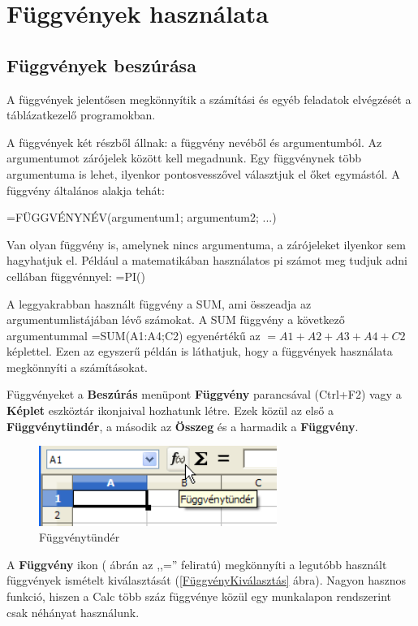 \chapter{Függvények használata}
\thispagestyle{empty}

\section{Függvények beszúrása}

A függvények jelentősen megkönnyítik a számítási és
egyéb feladatok elvégzését a táblázatkezelő
programokban.

A függvények két részből állnak: a függvény
nevéből és argumentumból. Az argumentumot zárójelek
között kell megadnunk. Egy függvénynek több argumentuma is
lehet, ilyenkor pontosvesszővel választjuk el őket
egymástól. A függvény általános alakja tehát:
\begin{center}
=FÜGGVÉNYNÉV(argumentum1; argumentum2; ...)
\end{center}

Van olyan függvény is, amelynek nincs argumentuma, a zárójeleket
ilyenkor sem hagyhatjuk el. Például a matematikában használatos
pi számot meg tudjuk adni cellában függvénnyel: =PI()

A leggyakrabban használt függvény a SUM, ami összeadja az
argumentumlistájában lévő számokat. A SUM függvény a
következő argumentummal =SUM(A1:A4;C2) egyenértékű az
$=A1+A2+A3+A4+C2$ képlettel. Ezen az egyszerű példán is
láthatjuk, hogy a függvények használata megkönnyíti a
számításokat.

Függvényeket a \textbf{Beszúrás} menüpont
\textbf{Függvény} parancsával (Ctrl+F2) vagy a \textbf{Képlet}
eszköztár ikonjaival hozhatunk létre. Ezek közül az első
a \textbf{Függvénytündér}, a második az \textbf{Összeg}
és a harmadik a \textbf{Függvény}.

\begin{figure}[!h]
\begin{center}
\includegraphics[width=7.751cm]{oocalcv1-img32.png}
\caption{Függvénytündér}\label{Függvénytündér}
\end{center}
\end{figure}

A \textbf{Függvény} ikon ( ábrán az
,,='' feliratú) megkönnyíti a
legutóbb használt függvények ismételt kiválasztását
(\ref{FüggvényKiválasztás} ábra).
Nagyon hasznos funkció, hiszen a Calc több száz
függvénye közül egy munkalapon rendszerint csak néhányat
használunk. 

